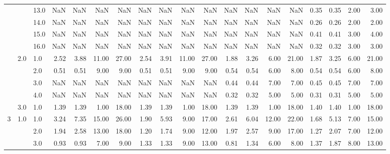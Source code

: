 \begin{tabular}{lllrrrrrrrrrrrrrrrr}
     &     & 13.0 &        NaN &       NaN &   NaN &    NaN &        NaN &       NaN &   NaN &    NaN &        NaN &       NaN &   NaN &    NaN &       0.35 &      0.35 & 2.00 &   3.00 \\
     &     & 14.0 &        NaN &       NaN &   NaN &    NaN &        NaN &       NaN &   NaN &    NaN &        NaN &       NaN &   NaN &    NaN &       0.26 &      0.26 & 2.00 &   2.00 \\
     &     & 15.0 &        NaN &       NaN &   NaN &    NaN &        NaN &       NaN &   NaN &    NaN &        NaN &       NaN &   NaN &    NaN &       0.41 &      0.41 & 3.00 &   4.00 \\
     &     & 16.0 &        NaN &       NaN &   NaN &    NaN &        NaN &       NaN &   NaN &    NaN &        NaN &       NaN &   NaN &    NaN &       0.32 &      0.32 & 3.00 &   3.00 \\
     & 2.0 & 1.0  &       2.52 &      3.88 & 11.00 &  27.00 &       2.54 &      3.91 & 11.00 &  27.00 &       1.88 &      3.26 &  6.00 &  21.00 &       1.87 &      3.25 & 6.00 &  21.00 \\
     &     & 2.0  &       0.51 &      0.51 &  9.00 &   9.00 &       0.51 &      0.51 &  9.00 &   9.00 &       0.54 &      0.54 &  6.00 &   8.00 &       0.54 &      0.54 & 6.00 &   8.00 \\
     &     & 3.0  &        NaN &       NaN &   NaN &    NaN &        NaN &       NaN &   NaN &    NaN &       0.44 &      0.44 &  7.00 &   7.00 &       0.45 &      0.45 & 7.00 &   7.00 \\
     &     & 4.0  &        NaN &       NaN &   NaN &    NaN &        NaN &       NaN &   NaN &    NaN &       0.32 &      0.32 &  5.00 &   5.00 &       0.31 &      0.31 & 5.00 &   5.00 \\
     & 3.0 & 1.0  &       1.39 &      1.39 &  1.00 &  18.00 &       1.39 &      1.39 &  1.00 &  18.00 &       1.39 &      1.39 &  1.00 &  18.00 &       1.40 &      1.40 & 1.00 &  18.00 \\
3 & 1.0 & 1.0  &       3.24 &      7.35 & 15.00 &  26.00 &       1.90 &      5.93 &  9.00 &  17.00 &       2.61 &      6.04 & 12.00 &  22.00 &       1.68 &      5.13 & 7.00 &  15.00 \\
     &     & 2.0  &       1.94 &      2.58 & 13.00 &  18.00 &       1.20 &      1.74 &  9.00 &  12.00 &       1.97 &      2.57 &  9.00 &  17.00 &       1.27 &      2.07 & 7.00 &  12.00 \\
     &     & 3.0  &       0.93 &      0.93 &  7.00 &   9.00 &       1.33 &      1.33 &  9.00 &  13.00 &       0.81 &      1.34 &  6.00 &   8.00 &       1.37 &      1.87 & 8.00 &  13.00 \\

\end{tabular}
